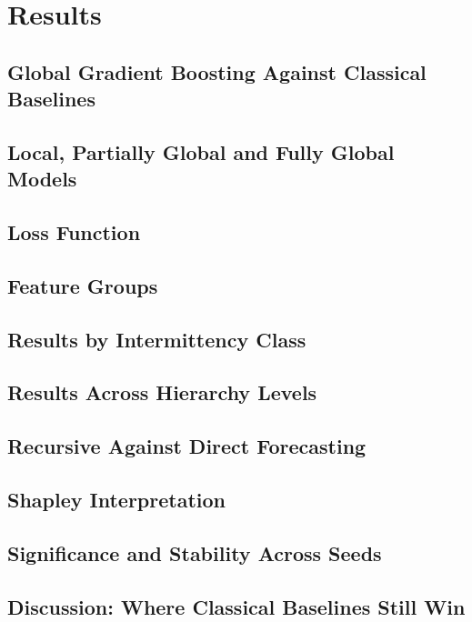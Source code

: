 \chapter{Results}
\label{ch:results}

\section{Global Gradient Boosting Against Classical Baselines}

\section{Local, Partially Global and Fully Global Models}

\section{Loss Function}

\section{Feature Groups}

\section{Results by Intermittency Class}

\section{Results Across Hierarchy Levels}

\section{Recursive Against Direct Forecasting}

\section{Shapley Interpretation}

\section{Significance and Stability Across Seeds}

\section{Discussion: Where Classical Baselines Still Win}


